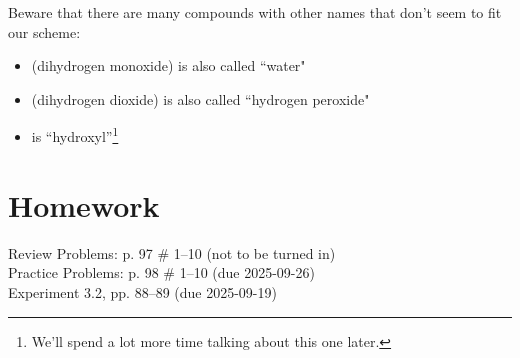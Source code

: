 \documentclass[11pt, oneside]{article}   	%
\begin{document}
Beware that there are many compounds with other names that don't seem to fit our scheme:
\begin{itemize}
\item {} (dihydrogen monoxide) is also called ``water"
\item {} (dihydrogen dioxide) is also called ``hydrogen peroxide"
\item {} is ``hydroxyl''\footnote{We'll spend a lot more time talking about this one later.}
\end{itemize}

\section{Homework}
Review Problems: p. 97 \# 1--10 (not to be turned in)\\
Practice Problems: p. 98 \# 1--10 (due 2025-09-26)\\
Experiment 3.2, pp. 88–89 (due 2025-09-19)\\


\nocite{wile-chem-2}
{}

\end{document}
